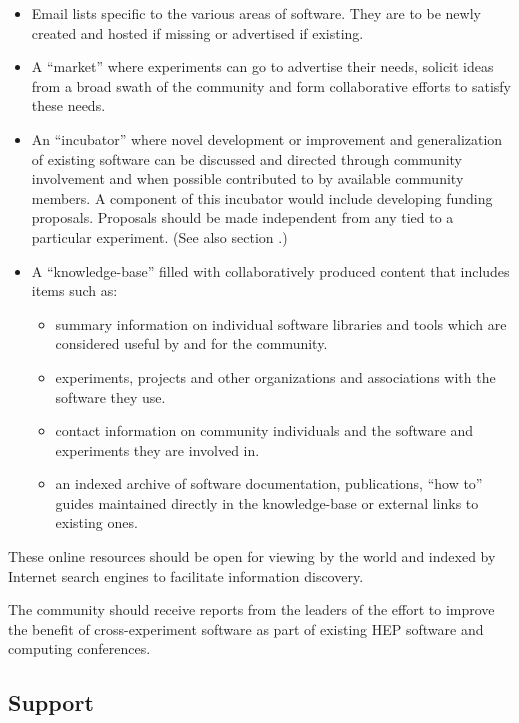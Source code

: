\begin{itemize}
\item Email lists specific to the various areas of software.  They are to be
  newly created and hosted if missing or advertised if existing.
\item A ``market'' where experiments can go to advertise their needs,
  solicit ideas from a broad swath of the community and form 
  collaborative efforts to satisfy these needs.
\item An ``incubator'' where novel development or improvement and
  generalization of existing software can be discussed and directed
  through community involvement and when possible contributed to by
  available community members.  A component of this incubator would
  include developing funding proposals.  Proposals should be made
  independent from any tied to a particular experiment.  (See also section \label{sec:support}.)
\item A ``knowledge-base'' filled with collaboratively produced content
  that includes items such as:
  \begin{itemize}
  \item summary information on individual software libraries and tools
    which are considered useful by and for the community.
  \item experiments, projects and other organizations and associations with the software they use.
  \item contact information on community individuals and the software
    and experiments they are involved in.
  \item an indexed archive of software documentation, publications,
    ``how to'' guides maintained directly in the knowledge-base or 
    external links to existing ones.
  \end{itemize}
\end{itemize}

\noindent These online resources should be open for viewing by the world and
indexed by Internet search engines to facilitate information
discovery.

The community should receive reports from the leaders of the effort to
improve the benefit of cross-experiment software as part of existing
HEP software and computing conferences.


\subsection{Support}
\label{sec:support}


